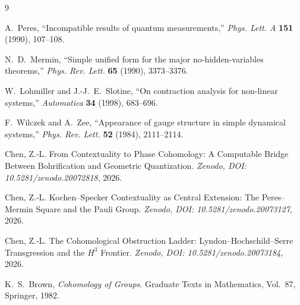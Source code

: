 \documentclass[11pt]{article}
\begin{document}
\begin{thebibliography}{9}

A.~Peres,
``Incompatible results of quantum measurements,''
\textit{Phys. Lett. A} \textbf{151} (1990), 107--108.

N.~D.~Mermin,
``Simple unified form for the major no-hidden-variables theorems,''
\textit{Phys. Rev. Lett.} \textbf{65} (1990), 3373--3376.

W.~Lohmiller and J.-J.~E.~Slotine,
``On contraction analysis for non-linear systems,''
\textit{Automatica} \textbf{34} (1998), 683--696.

F.~Wilczek and A.~Zee,
``Appearance of gauge structure in simple dynamical systems,''
\textit{Phys. Rev. Lett.} \textbf{52} (1984), 2111--2114.

Chen, Z.-L.
From Contextuality to Phase Cohomology:
A Computable Bridge Between Bohrification and Geometric Quantization.
\textit{Zenodo, DOI: 10.5281/zenodo.20072818}, 2026.

Chen, Z.-L.
Kochen--Specker Contextuality as Central Extension: 
The Peres--Mermin Square and the Pauli Group.
\textit{Zenodo, DOI: 10.5281/zenodo.20073127}, 2026.

Chen, Z.-L.
The Cohomological Obstruction Ladder: 
Lyndon--Hochschild--Serre Transgression and the $H^3$ Frontier.
\textit{Zenodo, DOI: 10.5281/zenodo.20073184}, 2026.

K.~S.~Brown,
\textit{Cohomology of Groups}.
Graduate Texts in Mathematics, Vol.~87, Springer, 1982.

\end{thebibliography}
\end{document}
